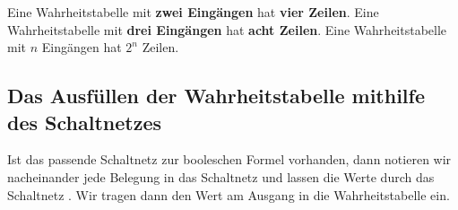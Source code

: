 \begin{important}
Eine Wahrheitstabelle mit \textbf{zwei Eingängen} hat \textbf{vier Zeilen}. Eine Wahrheitstabelle mit \textbf{drei Eingängen} hat \textbf{acht Zeilen}. Eine Wahrheitstabelle mit $n$ Eingängen hat $2^n$ Zeilen.
\end{important}

\subsection{Das Ausfüllen der Wahrheitstabelle mithilfe des Schaltnetzes}

Ist das passende Schaltnetz zur booleschen Formel vorhanden, dann notieren wir nacheinander jede Belegung in das Schaltnetz und lassen die Werte durch das Schaltnetz . Wir tragen dann den Wert am Ausgang in die Wahrheitstabelle ein.


